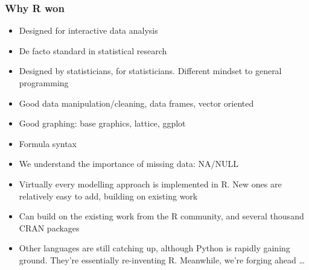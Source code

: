 \documentclass{beamer}
\begin{document}
\begin{frame}
\frametitle{Why R won}
\begin{itemize}
\item Designed for interactive data analysis
\item De facto standard in statistical research
\item Designed by statisticians, for statisticians. Different mindset to
			general programming
\item Good data manipulation/cleaning, data frames, vector oriented
\item Good graphing: base graphics, lattice, ggplot
\item Formula syntax
\item We understand the importance of missing data: NA/NULL
\item Virtually every modelling approach is implemented in R. New ones are relatively easy
			to add, building on existing work
\item Can build on the existing work from the R community, and several thousand
			CRAN packages
\item Other languages are still catching up, although Python is rapidly gaining
			ground. They're essentially re-inventing R. Meanwhile, we're forging ahead \ldots
\end{itemize}
\end{frame}

\end{document}
